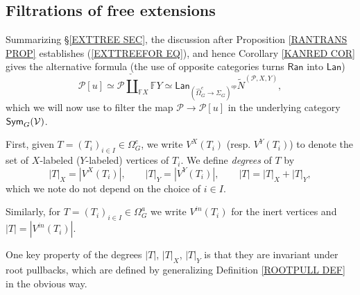 \documentclass[a4paper,10pt]{article}%
\begin{document}
\renewcommand{\labelenumi}{\theenumi}
\renewcommand{\theenumi}{(\roman{enumi})}%

\subsection{Filtrations of free extensions}
\label{FILTRATION_SECTION}

Summarizing \S \ref{EXTTREE SEC},
the discussion after Proposition \ref{RANTRANS PROP}
establishes (\ref{EXTTREEFOR EQ}), and hence 
Corollary \ref{KANRED COR} 
gives the alternative formula
(the use of opposite categories turns 
$\mathsf{Ran}$ into $\mathsf{Lan}$)
\begin{equation}\label{ALTFOR EQ}
	\mathcal{P}[u] \simeq
	\mathcal{P} \mathbin{\check{\coprod}}_{\mathbb{F} X} \mathbb{F} Y 
\simeq 
	\mathsf{Lan}_{\left( \widehat{\Omega}_{G}^{e} \to \Sigma_G \right)^{op}}
	\tilde{N}^{(\mathcal{P},X,Y)},
\end{equation}
which we will now use to 
filter the map
$\mathcal{P} \to \mathcal{P}[u]$
in the underlying category
$\mathsf{Sym}_G(\mathcal V)$.

First, given 
$T = (T_i)_{i \in I} \in \Omega_G^e$,
we write $V^X(T_i)$ (resp. $V^Y(T_i)$)
to denote the set of 
$X$-labeled ($Y$-labeled) vertices of $T_i$.
We define \textit{degrees} of $T$ by
\[
|T|_X = |V^X(T_i)|,
	\qquad
|T|_Y = |V^Y(T_i)|,
	\qquad
|T| = |T|_X + |T|_Y,
\]
which we note do not depend on the choice of $i \in I$.

Similarly, for $T = (T_i)_{i \in I} \in \Omega_G^a$
we write $V^{in}(T_i)$ for the inert vertices and
$|T| = |V^{in}(T_i)|$.

\begin{remark}
	One key property of the degrees $|T|$, $|T|_X$, $|T|_Y$ is that they are invariant under root pullbacks, which are defined
	by generalizing Definition \ref{ROOTPULL DEF}
	in the obvious way.
\end{remark}
\end{document}
